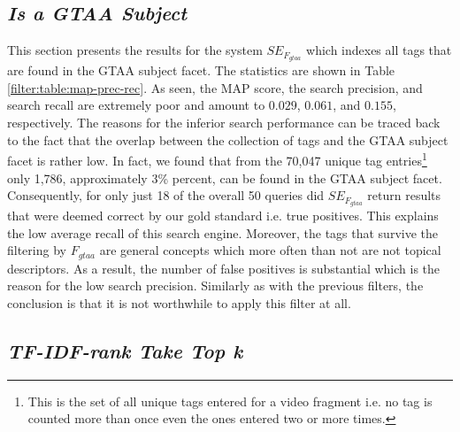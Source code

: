 \subsection{\textit{Is a GTAA Subject}}
This section presents the results for the system $SE_{F_{gtaa}}$ which indexes all tags that are found in the GTAA subject facet. The statistics are shown in Table \ref{filter:table:map-prec-rec}. As seen, the MAP score, the search precision, and search recall are extremely poor and amount to $0.029$, $0.061$, and $0.155$, respectively. The reasons for the inferior search performance can be traced back to the fact that the overlap between the collection of tags and the GTAA subject facet is rather low. In fact, we found that from the 70,047 unique tag entries\footnote{This is the set of all unique tags entered for a video fragment i.e. no tag is counted more than once even the ones entered two or more times.} only 1,786, approximately 3\% percent, can be found in the GTAA subject facet.  Consequently, for only just 18 of the overall 50 queries did $SE_{F_{gtaa}}$ return results that were deemed correct by our gold standard i.e. true positives. This explains the low average recall of this search engine. Moreover, the tags that survive the filtering by $F_{gtaa}$ are general concepts which more often than not are not topical descriptors. As a result, the number of false positives is substantial which is the reason for the low search precision. Similarly as with the previous filters, the conclusion is that it is not worthwhile to apply this filter at all.


\subsection{\textit{\textit{TF-IDF-rank Take Top k}}}

